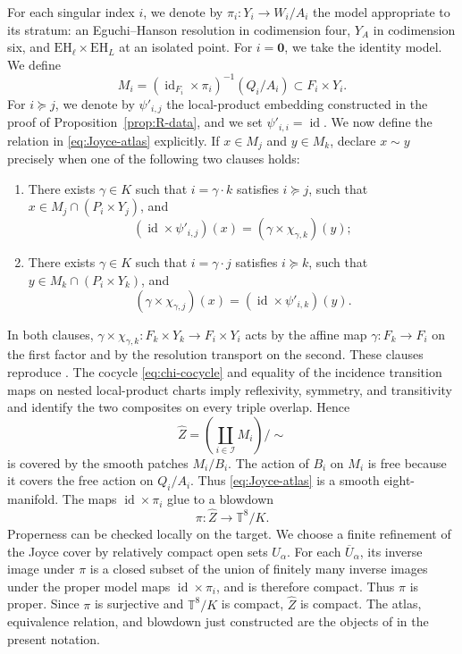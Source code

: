 \documentclass[11pt]{article}
\theoremstyle{remark}\newtheorem{remark}[theorem]{Remark}
\newcommand{\EH}{\mathrm{EH}}
\newcommand{\T}{\mathbb T}
\newcommand{\id}{\operatorname{id}}
\begin{document}
For each singular index $i$, we denote by $\pi_i:Y_i\to W_i/A_i$ the model
appropriate to its stratum: an Eguchi--Hanson resolution in codimension
four, $Y_A$ in codimension six, and $\EH_\ell\times\EH_L$ at an isolated
point.  For $i=\mathbf 0$, we take the identity model.  We define
\begin{equation}\label{eq:Joyce-patches}
 M_i=(\id_{F_i}\times\pi_i)^{-1}(Q_i/A_i)
       \subset F_i\times Y_i.
\end{equation}
For $i\succeq j$, we denote by $\psi'_{i,j}$ the local-product embedding
constructed in the proof of Proposition~\ref{prop:R-data}, and we set
$\psi'_{i,i}=\id$.  We now define the relation in
\eqref{eq:Joyce-atlas} explicitly.  If $x\in M_j$ and $y\in M_k$, declare
$x\sim y$ precisely when one of the following two clauses holds:
\begin{enumerate}
\item There exists $\gamma\in K$ such that $i=\gamma\cdot k$ satisfies
$i\succeq j$, such that
$x\in M_j\cap(P_i\times Y_j)$, and
\begin{equation}\label{eq:atlas-relation-a}
 (\id\times\psi'_{i,j})(x)
   =(\gamma\times\chi_{\gamma,k})(y);
\end{equation}
\item There exists $\gamma\in K$ such that $i=\gamma\cdot j$ satisfies
$i\succeq k$, such that
$y\in M_k\cap(P_i\times Y_k)$, and
\begin{equation}\label{eq:atlas-relation-b}
 (\gamma\times\chi_{\gamma,j})(x)
   =(\id\times\psi'_{i,k})(y).
\end{equation}
\end{enumerate}
In both clauses, $\gamma\times\chi_{\gamma,k}:F_k\times Y_k\to
F_i\times Y_i$ acts by the affine map $\gamma:F_k\to F_i$ on the first
factor and by the resolution transport on the second.  These clauses
reproduce \cite[Definition 13.2.5]{JoyceBook}.  The cocycle
\eqref{eq:chi-cocycle} and equality of the incidence transition maps on
nested local-product charts imply reflexivity, symmetry, and transitivity
and identify the two composites on every triple overlap.  Hence
\begin{equation}\label{eq:Joyce-atlas}
 \widehat Z=\left(\coprod_{i\in\mathcal I}M_i\right)\big/\!\sim
\end{equation}
is covered by the smooth patches $M_i/B_i$.  The action of $B_i$ on $M_i$
is free because it covers the free action on $Q_i/A_i$.  Thus
\eqref{eq:Joyce-atlas} is a smooth
eight-manifold.  The maps $\id\times\pi_i$ glue to a blowdown
\begin{equation}\label{eq:Joyce-blowdown}
 \pi:\widehat Z\longrightarrow\T^8/K.
\end{equation}
Properness can be checked locally on the target.  We choose a finite
refinement of the Joyce cover by relatively compact open sets $U_\alpha$.
For each $\overline U_\alpha$, its inverse image under $\pi$ is a closed
subset of the union of finitely many inverse images under the proper model
maps $\id\times\pi_i$, and is therefore compact.  Thus $\pi$ is proper.
Since $\pi$ is surjective and $\T^8/K$ is compact, $\widehat Z$ is compact.
The atlas, equivalence relation, and blowdown just constructed are the
objects of \cite[Definition 13.2.5]{JoyceBook} in the present notation.
\end{document}
